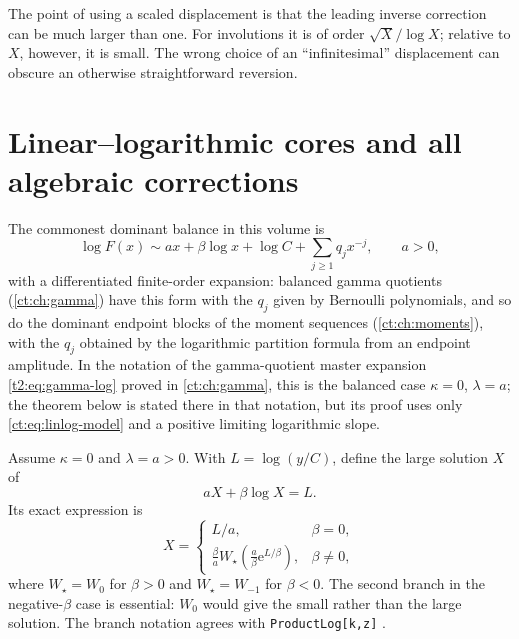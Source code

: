 \documentclass[11pt,openany]{book}
\numberwithin{equation}{chapter}
\theoremstyle{plain}
\theoremstyle{definition}
\theoremstyle{remark}
\newcommand{\ee}{\mathrm e}
\begin{document}
The point of using a scaled displacement is that the leading inverse correction can be much larger than one. For involutions it is of order $\sqrt X/\log X$; relative to $X$, however, it is small. The wrong choice of an ``infinitesimal'' displacement can obscure an otherwise straightforward reversion.

\section{Linear--logarithmic cores and all algebraic corrections}
\label{ct:sec:linlog}

The commonest dominant balance in this volume is
\begin{equation}
 \log F(x)\sim ax+\beta\log x+\log C+\sum_{j\ge1}q_jx^{-j},\qquad a>0,
 \label{ct:eq:linlog-model}
\end{equation}
with a differentiated finite-order expansion: balanced gamma quotients
(\cref{ct:ch:gamma}) have this form with the $q_j$ given by Bernoulli
polynomials, and so do the dominant endpoint blocks of the moment sequences
(\cref{ct:ch:moments}), with the $q_j$ obtained by the logarithmic partition
formula from an endpoint amplitude.  In the notation of the gamma-quotient
master expansion \cref{t2:eq:gamma-log} proved in \cref{ct:ch:gamma}, this is
the balanced case $\kappa=0$, $\lambda=a$; the theorem below is stated there
in that notation, but its proof uses only \cref{ct:eq:linlog-model} and a
positive limiting logarithmic slope.

Assume $\kappa=0$ and $\lambda=a>0$. With $L=\log(y/C)$, define the large solution $X$ of
\begin{equation}
 aX+\beta\log X=L.
 \label{t2:eq:balanced-core}
\end{equation}
Its exact expression is
\begin{equation}
 X=\begin{cases}
 L/a,&\beta=0,\\[1mm]
 \displaystyle\frac{\beta}{a}
 W_{\star}\!\left(\frac a\beta\ee^{L/\beta}\right),&\beta\ne0,
 \end{cases}
 \label{t2:eq:balanced-W}
\end{equation}
where $W_\star=W_0$ for $\beta>0$ and $W_\star=W_{-1}$ for $\beta<0$. The second branch in the negative-$\beta$ case is essential: $W_0$ would give the small rather than the large solution. The branch notation agrees with \texttt{ProductLog[k,z]} \cite{wlproductlog}.
\end{document}
